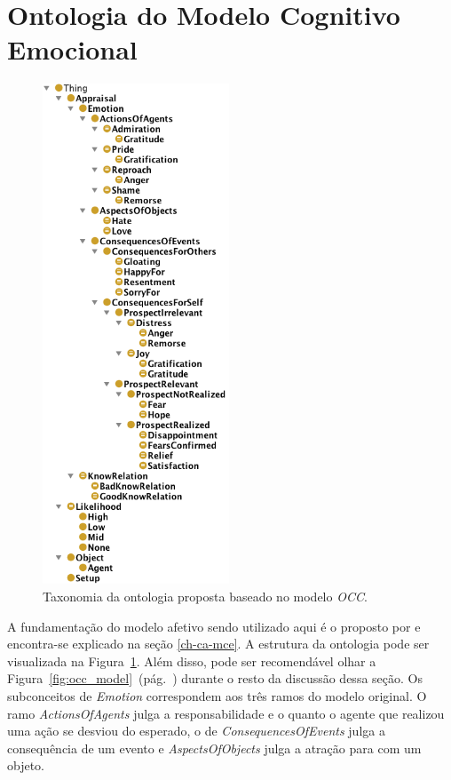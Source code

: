 \section{Ontologia do Modelo Cognitivo Emocional} \label{ch:aec:omce}

\begin{figure}
  \includegraphics[height=149mm]{figuras/hierarquiaLOCC.png}
  \caption{Taxonomia da ontologia proposta baseado no modelo \emph{OCC}.}
  \label{fig:tlocc}
\end{figure}

A fundamentação do modelo afetivo sendo utilizado aqui é o proposto por
\citet{ortony1988cse} e encontra-se explicado na seção \ref{ch-ca-mce}. A
estrutura da ontologia pode ser visualizada na
Figura~\ref{fig:tlocc}. Além disso, pode ser recomendável olhar a
Figura~\ref{fig:occ_model}~(pág.~\pageref{fig:occ_model})
durante o resto da discussão dessa seção. Os subconceitos de \emph{Emotion}
correspondem aos três ramos do modelo original.
O ramo \emph{ActionsOfAgents} julga a responsabilidade e o quanto o agente que
realizou uma ação se desviou do esperado, o de
\emph{ConsequencesOfEvents} julga a consequência de um evento e
\emph{AspectsOfObjects} julga a atração para com um objeto.

